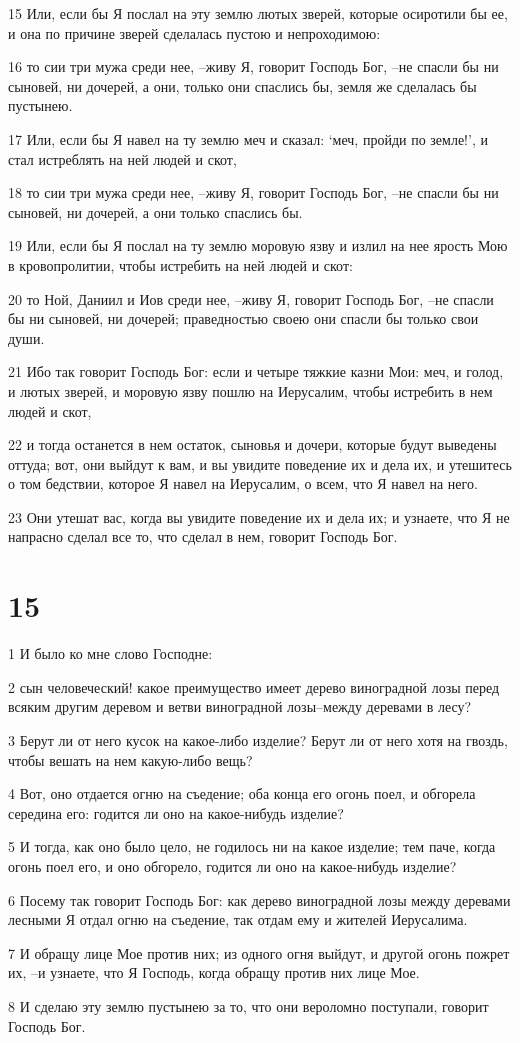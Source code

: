 \par 15 Или, если бы Я послал на эту землю лютых зверей, которые осиротили бы ее, и она по причине зверей сделалась пустою и непроходимою:
\par 16 то сии три мужа среди нее, --живу Я, говорит Господь Бог, --не спасли бы ни сыновей, ни дочерей, а они, только они спаслись бы, земля же сделалась бы пустынею.
\par 17 Или, если бы Я навел на ту землю меч и сказал: `меч, пройди по земле!', и стал истреблять на ней людей и скот,
\par 18 то сии три мужа среди нее, --живу Я, говорит Господь Бог, --не спасли бы ни сыновей, ни дочерей, а они только спаслись бы.
\par 19 Или, если бы Я послал на ту землю моровую язву и излил на нее ярость Мою в кровопролитии, чтобы истребить на ней людей и скот:
\par 20 то Ной, Даниил и Иов среди нее, --живу Я, говорит Господь Бог, --не спасли бы ни сыновей, ни дочерей; праведностью своею они спасли бы только свои души.
\par 21 Ибо так говорит Господь Бог: если и четыре тяжкие казни Мои: меч, и голод, и лютых зверей, и моровую язву пошлю на Иерусалим, чтобы истребить в нем людей и скот,
\par 22 и тогда останется в нем остаток, сыновья и дочери, которые будут выведены оттуда; вот, они выйдут к вам, и вы увидите поведение их и дела их, и утешитесь о том бедствии, которое Я навел на Иерусалим, о всем, что Я навел на него.
\par 23 Они утешат вас, когда вы увидите поведение их и дела их; и узнаете, что Я не напрасно сделал все то, что сделал в нем, говорит Господь Бог.

\chapter{15}

\par 1 И было ко мне слово Господне:
\par 2 сын человеческий! какое преимущество имеет дерево виноградной лозы перед всяким другим деревом и ветви виноградной лозы--между деревами в лесу?
\par 3 Берут ли от него кусок на какое-либо изделие? Берут ли от него хотя на гвоздь, чтобы вешать на нем какую-либо вещь?
\par 4 Вот, оно отдается огню на съедение; оба конца его огонь поел, и обгорела середина его: годится ли оно на какое-нибудь изделие?
\par 5 И тогда, как оно было цело, не годилось ни на какое изделие; тем паче, когда огонь поел его, и оно обгорело, годится ли оно на какое-нибудь изделие?
\par 6 Посему так говорит Господь Бог: как дерево виноградной лозы между деревами лесными Я отдал огню на съедение, так отдам ему и жителей Иерусалима.
\par 7 И обращу лице Мое против них; из одного огня выйдут, и другой огонь пожрет их, --и узнаете, что Я Господь, когда обращу против них лице Мое.
\par 8 И сделаю эту землю пустынею за то, что они вероломно поступали, говорит Господь Бог.

